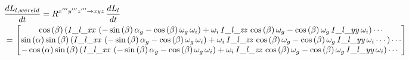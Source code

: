 \begin{align*}
&\frac{dL_{l,wereld}}{dt}=R^{x'''y'''z''' \rightarrow xyz}\,\frac{dL_{l}}{dt}\\
&=\begin{bmatrix}
\cos \left( \beta \right)  \left( {\it 
I\_l\_xx}\, \left( -\sin \left( \beta \right) \alpha_{g}-\cos \left( 
\beta \right) \omega_{g}\,\omega_{i} \right) +\omega_{i}\,{\it 
I\_l\_zz}\,\cos \left( \beta \right) \omega_{g}-\cos \left( \beta
 \right) \omega_{g}\,{\it I\_l\_yy}\,\omega_{i} \right)\cdots
\\ 
\sin \left( \alpha \right) \sin \left( 
\beta \right)  \left( {\it I\_l\_xx}\, \left( -\sin \left( \beta
 \right) \alpha_{g}-\cos \left( \beta \right) \omega_{g}\,\omega_{i}
 \right) +\omega_{i}\,{\it I\_l\_zz}\,\cos \left( \beta \right) \omega
_{g}-\cos \left( \beta \right) \omega_{g}\,{\it I\_l\_yy}\,\omega_{i}\cdots\right)\cdots 
\\ 
-\cos \left( \alpha
 \right) \sin \left( \beta \right)  \left( {\it I\_l\_xx}\, \left( -
\sin \left( \beta \right) \alpha_{g}-\cos \left( \beta \right) \omega_
{g}\,\omega_{i} \right) +\omega_{i}\,{\it I\_l\_zz}\,\cos \left( \beta
 \right) \omega_{g}-\cos \left( \beta \right) \omega_{g}\,{\it 
I\_l\_yy}\,\omega_{i}\right)\cdots\
\end{bmatrix}
\end{align*}

